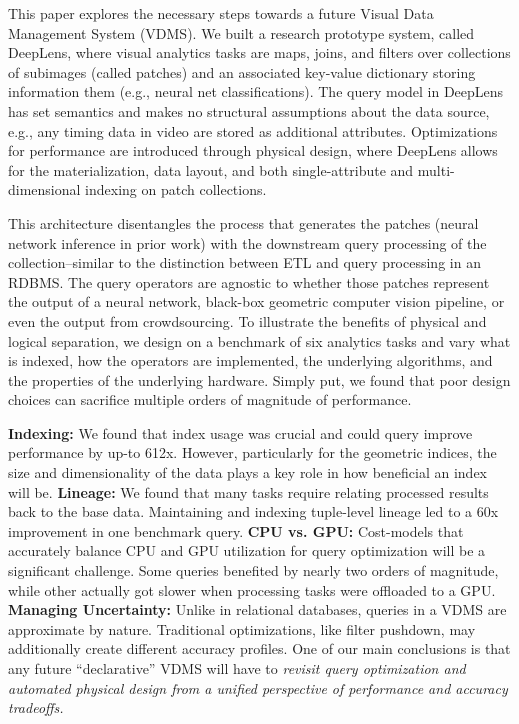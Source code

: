 This paper explores the necessary steps towards a future Visual Data Management System (VDMS).
We built a research prototype system, called \textsf{DeepLens}, where visual analytics tasks are maps, joins, and filters over collections of subimages (called patches) and an associated key-value dictionary storing information them (e.g., neural net classifications). The query model in \textsf{DeepLens} has set semantics and makes no structural assumptions about the data source, e.g., any timing data in video are stored as additional attributes. Optimizations for performance are introduced through physical design, where \textsf{DeepLens} allows for the materialization, data layout, and both single-attribute and multi-dimensional indexing on patch collections.

This architecture disentangles the process that generates the patches (neural network inference in prior work) with the downstream query processing of the collection--similar to the distinction between ETL and query processing in an RDBMS.
The query operators are agnostic to whether those patches represent the output of a neural network, black-box geometric computer vision pipeline, or even the output from crowdsourcing. 
To illustrate the benefits of physical and logical separation, we design on a benchmark of six analytics tasks and vary what is indexed, how the operators are implemented, the underlying algorithms, and the properties of the underlying hardware.
 Simply put, we found that poor design choices can sacrifice multiple orders of magnitude of performance.
 
\textbf{Indexing: } We found that index usage was crucial and could query improve performance by up-to 612x. However, particularly for the geometric indices, the size and dimensionality of the data plays a key role in how beneficial an index will be.
\textbf{Lineage: }We found that many tasks require relating processed results back to the base data.
Maintaining and indexing tuple-level lineage led to a 60x improvement in one benchmark query.
\textbf{CPU vs. GPU: } Cost-models that accurately balance CPU and GPU utilization for query optimization will be a significant challenge. Some queries benefited by nearly two orders of magnitude, while other actually got slower when processing tasks were offloaded to a GPU.
\textbf{Managing Uncertainty: } Unlike in relational databases, queries in a VDMS are approximate by nature. Traditional optimizations, like filter pushdown, may additionally create different accuracy profiles.  One of our main conclusions is that any future ``declarative'' VDMS will have to \emph{revisit query optimization and automated physical design from a unified perspective of performance and accuracy tradeoffs.}  







